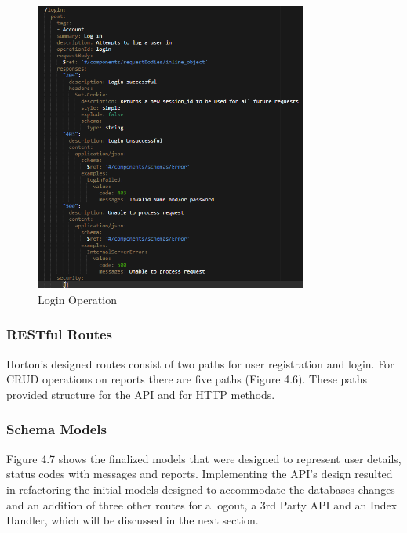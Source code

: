 \begin{figure}[H]
    \caption{Login Operation}
    \label{image:operationId}
    \centering
    \includegraphics[width=0.8\textwidth]{images/open_api/login-spec.png}
\end{figure}

\subsubsection{RESTful Routes}
Horton's designed routes consist of two paths for user registration and login. For CRUD operations on reports there are five paths (Figure 4.6). These paths provided structure for the API and for HTTP methods.

\subsubsection{Schema Models}
Figure 4.7 shows the finalized models that were designed to represent user details, status codes with messages and reports. Implementing the API’s design resulted in refactoring the initial models designed to accommodate the databases changes and an addition of three other routes for a logout, a 3rd Party API and an Index Handler, which will be discussed in the next section.

